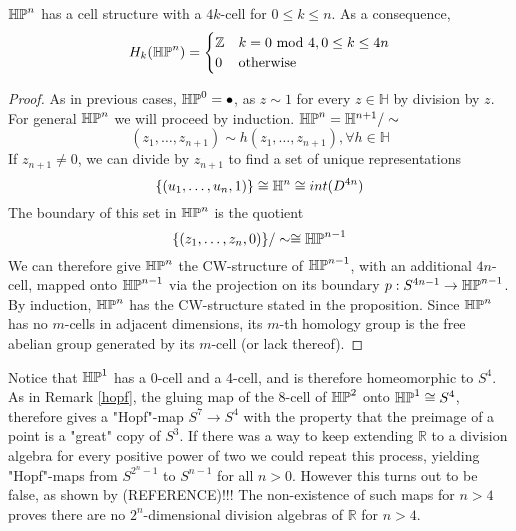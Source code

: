 \begin{prop}
$\mathbb{HP}^{n}$ has a cell structure with a $4k$-cell for $0\leq k\leq n$. As a consequence, $$H_k(\mathbb{HP}^{n})=\begin{cases}\mathbb{Z} & k=0\text{ mod } 4 , 0\leq k\leq 4n \\ 0 & \text{otherwise}\end{cases}$$
\end{prop}

\begin{proof}
As in previous cases, $\mathbb{HP}^{0}=\bullet$, as $z\sim 1$ for every $z\in \mathbb{H}$ by division by $z$. For general $\mathbb{HP}^{n}$ we will proceed by induction. $\mathbb{HP}^{n}=\mathbb{H}^{n+1}/\sim$
$$(z_1,\dots,z_{n+1})\sim h(z_1,\dots,z_{n+1}), \forall h\in \mathbb{H}$$
If $z_{n+1}\neq 0$, we can divide by $z_{n+1}$ to find a set of unique representations
$$\{(u_1,\dots,u_n,1)\}\cong \mathbb{H}^n\cong int(D^{4n})$$
The boundary of this set in $\mathbb{HP}^{n}$ is the quotient 
$$\{(z_1,\dots,z_n,0)\}/\sim \cong \mathbb{HP}^{n-1}$$
We can therefore give $\mathbb{HP}^{n}$ the CW-structure of $\mathbb{HP}^{n-1}$, with an additional $4n$-cell, mapped onto $\mathbb{HP}^{n-1}$ via the projection on its boundary $p:S^{4n-1}\rightarrow \mathbb{HP}^{n-1}$. By induction, $\mathbb{HP}^{n}$ has the CW-structure stated in the proposition. Since $\mathbb{HP}^{n}$ has no $m$-cells in adjacent dimensions, its $m$-th homology group is the free abelian group generated by its $m$-cell (or lack thereof).
\end{proof}

\begin{remark}
Notice that $\mathbb{HP}^{1}$ has a 0-cell and a 4-cell, and is therefore homeomorphic to $S^{4}$. As in Remark \ref{hopf}, the gluing map of the 8-cell of $\mathbb{HP}^{2}$ onto $\mathbb{HP}^{1}\cong S^{4}$, therefore gives a "Hopf"-map $S^7\rightarrow S^4$ with the property that the preimage of a point is a "great" copy of $S^3$. If there was a way to keep extending $\mathbb{R}$ to a division algebra for every positive power of two we could repeat this process, yielding "Hopf"-maps from $S^{2^n-1}$ to $S^{n-1}$ for all $n>0$. However this turns out to be false, as shown by (REFERENCE)!!! The non-existence of such maps for $n>4$ proves there are no $2^n$-dimensional division algebras of $\mathbb{R}$ for $n>4$.
\end{remark}